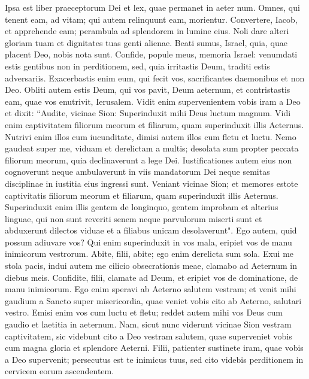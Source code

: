 \begin{biblechapter}  
\verse Ipsa est liber praeceptorum Dei et lex, quae permanet in aeter num. Omnes, qui tenent eam, ad vitam; qui autem relinquunt eam, morientur. 
\verse Convertere, Iacob, et apprehende eam; perambula ad splendorem in lumine eius. 
\verse Noli dare alteri gloriam tuam et dignitates tuas genti alienae. 
\verse Beati sumus, Israel, quia, quae placent Deo, nobis nota sunt. 
\verse Confide, popule meus, memoria Israel: 
\verse venumdati estis gentibus non in perditionem, sed, quia irritastis Deum, traditi estis adversariis. 
\verse Exacerbastis enim eum, qui fecit vos, sacrificantes daemonibus et non Deo. 
\verse Obliti autem estis Deum, qui vos pavit, Deum aeternum, et contristastis eam, quae vos enutrivit, Ierusalem. 
\verse Vidit enim supervenientem vobis iram a Deo et dixit: “Audite, vicinae Sion: Superinduxit mihi Deus luctum magnum. 
\verse Vidi enim captivitatem filiorum meorum et filiarum, quam superinduxit illis Aeternus. 
\verse Nutrivi enim illos cum iucunditate, dimisi autem illos cum fletu et luctu. 
\verse Nemo gaudeat super me, viduam et derelictam a multis; desolata sum propter peccata filiorum meorum, quia declinaverunt a lege Dei. 
\verse Iustificationes autem eius non cognoverunt neque ambulaverunt in viis mandatorum Dei neque semitas disciplinae in iustitia eius ingressi sunt. 
\verse Veniant vicinae Sion; et memores estote captivitatis filiorum meorum et filiarum, quam superinduxit illis Aeternus. 
\verse Superinduxit enim illis gentem de longinquo, gentem improbam et alterius linguae, qui non sunt reveriti senem neque parvulorum miserti sunt 
\verse et abduxerunt dilectos viduae et a filiabus unicam desolaverunt". 
\verse Ego autem, quid possum adiuvare vos? 
\verse Qui enim superinduxit in vos mala, eripiet vos de manu inimicorum vestrorum. 
\verse Abite, filii, abite; ego enim derelicta sum sola. 
\verse Exui me stola pacis, indui autem me cilicio obsecrationis meae, clamabo ad Aeternum in diebus meis. 
\verse Confidite, filii, clamate ad Deum, et eripiet vos de dominatione, de manu inimicorum. 
\verse Ego enim speravi ab Aeterno salutem vestram; et venit mihi gaudium a Sancto super misericordia, quae veniet vobis cito ab Aeterno, salutari vestro. 
\verse Emisi enim vos cum luctu et fletu; reddet autem mihi vos Deus cum gaudio et laetitia in aeternum. 
\verse Nam, sicut nunc viderunt vicinae Sion vestram captivitatem, sic videbunt cito a Deo vestram salutem, quae superveniet vobis cum magna gloria et splendore Aeterni. 
\verse Filii, patienter sustinete iram, quae vobis a Deo supervenit; persecutus est te inimicus tuus, sed cito videbis perditionem in cervicem eorum ascendentem. 

\end{biblechapter}
